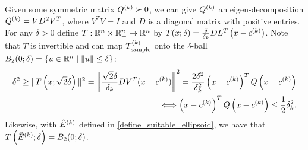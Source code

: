 \documentclass{article}
\begin{document}
Given some symmetric matrix ${Q^{(k)}} \succ 0$, we can give ${Q^{(k)}}$ an eigen-decomposition ${Q^{(k)}} = V D^2 V^T$,
where $V^TV = I$ and $D$ is a diagonal matrix with positive entries.
For any
$\delta > 0$ define $T:\mathbb R^n \times \mathbb R^n_+ \rightarrow \mathbb R^n$ by $T(x; \delta) = \frac{\delta}{\delta_k} DL^T\left(x - c^{(k)}\right)$.
Note that $T$ is invertible and can map ${T_{\text{sample}}^{(k)}}$ onto the $\delta$-ball
$B_2(0;\delta) = \left\{u \in \mathbb R^n \; | \; \|u\| \le \delta\right\}$:
\begin{align*}
\delta^2 \ge \|T\left(x; \sqrt{2}\delta\right)\|^2 = \left\|\frac {\sqrt{2}\delta} {\delta_k} DV^T(x - c^{(k)})\right \|^2
= \frac {2\delta^2} {\delta_k^2} \left(x - c^{(k)}\right)^TQ\left(x - c^{(k)}\right) \\
\Longleftrightarrow \left(x - c^{(k)}\right)^TQ\left(x - c^{(k)}\right) \le \frac 1 2 \delta_k^2.
\end{align*}
Likewise, with ${{\hat E}^{(k)}}$ defined in \cref{define_suitable_ellipsoid}, we have that
$T\left({{\hat E}^{(k)}}; \delta\right) = B_2(0; \delta)$.
\end{document}
